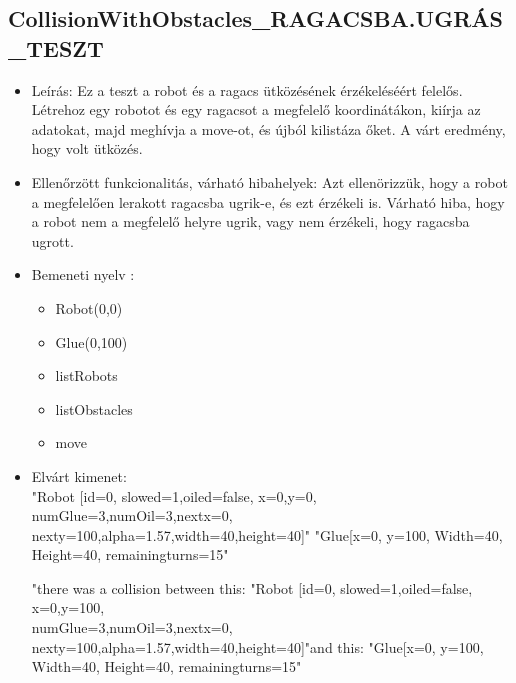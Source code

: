 \subsection{CollisionWithObstacles\_RAGACSBA.UGRÁS\_TESZT}
\begin{itemize}
	\item Leírás: Ez a teszt a robot és a ragacs ütközésének érzékeléséért felelős.
	                Létrehoz egy robotot és egy ragacsot a megfelelő koordinátákon, kiírja az adatokat, majd meghívja a move-ot, és újból kilistáza őket. A várt eredmény, hogy volt ütközés.
\newline
	\item  Ellenőrzött funkcionalitás, várható hibahelyek: Azt ellenörizzük, hogy a robot a megfelelően lerakott ragacsba ugrik-e, és ezt érzékeli is.
		   Várható hiba, hogy a robot nem a megfelelő helyre ugrik, vagy nem érzékeli, hogy ragacsba ugrott.
	\item Bemeneti nyelv :
		\begin{itemize}
		\item Robot(0,0)
		\item Glue(0,100)
		\item listRobots
		\item listObstacles
		\item move
		\end{itemize}
	
	\item Elvárt kimenet: \\
		"Robot [id=0,  slowed=1,oiled=false, x=0,y=0, 
		\\numGlue=3,numOil=3,nextx=0,
		\\nexty=100,alpha=1.57,width=40,height=40]"\newline
		"Glue[x=0, y=100, Width=40, Height=40, remainingturns=15"\newline
		
		"there was a collision between this: "Robot [id=0,  slowed=1,oiled=false, x=0,y=100, 
		\\numGlue=3,numOil=3,nextx=0,
		\\nexty=100,alpha=1.57,width=40,height=40]"\newline and this: "Glue[x=0, y=100, Width=40, Height=40, remainingturns=15"\newline
\end{itemize}

\pagebreak
